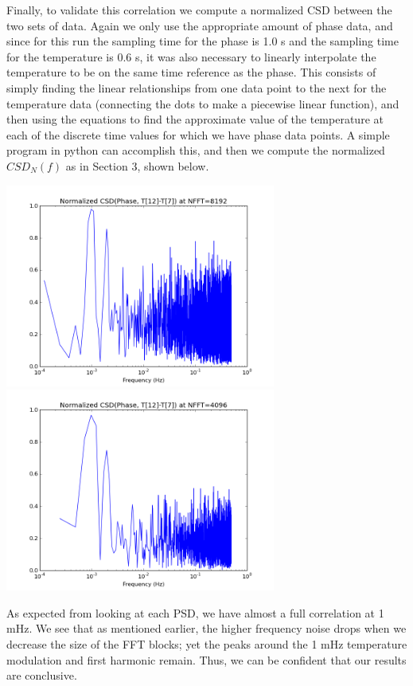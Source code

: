 \documentclass[11 pt]{article}
\begin{document}
Finally, to validate this correlation we compute a normalized CSD between the two sets of data. Again we only use the appropriate amount of phase data, and since for this run the sampling time for the phase is 1.0 s and the sampling time for the temperature is 0.6 s, it was also necessary to linearly interpolate the temperature to be on the same time reference as the phase. This consists of simply finding the linear relationships from one data point to the next for the temperature data (connecting the dots to make a piecewise linear function), and then using the equations to find the approximate value of the temperature at each of the discrete time values for which we have phase data points. A simple program in python can accomplish this, and then we compute the normalized $CSD_N(f)$ as in Section 3, shown below.
\begin{center}\noindent\includegraphics[width=3.5in]{CSDNFFT8192.png}\includegraphics[width=3.5in]{CSDNFFT4096.png}\\\end{center}

As expected from looking at each PSD, we have almost a full correlation at 1 mHz. We see that as mentioned earlier, the higher frequency noise drops when we decrease the size of the FFT blocks; yet the peaks around the 1 mHz temperature modulation and first harmonic remain. Thus, we can be confident that our results are conclusive.
\end{document}
